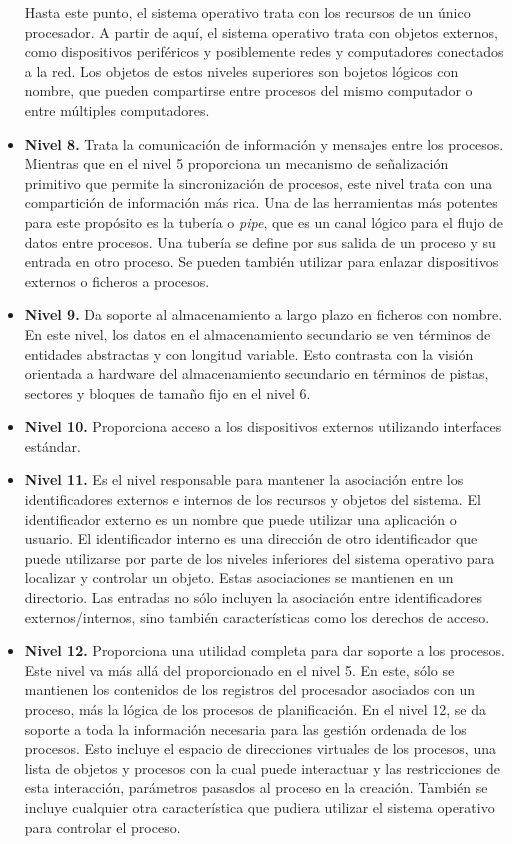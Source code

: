 \documentclass{article}
\begin{document}
\begin{itemize}
				Hasta este punto, el sistema operativo trata con los recursos de un único procesador. A partir de aquí, el sistema operativo trata con objetos externos, como dispositivos periféricos y posiblemente redes y computadores conectados a la red. Los objetos de estos niveles superiores son bojetos lógicos con nombre, que pueden compartirse entre procesos del mismo computador o entre múltiples computadores.
				
				\item \textbf{Nivel 8.} Trata la comunicación de información y mensajes entre los procesos. Mientras que en el nivel 5 proporciona un mecanismo de señalización primitivo que permite la sincronización de procesos, este nivel trata con una compartición de información más rica. Una de las herramientas más potentes para este propósito es la tubería o \textit{pipe}, que es un canal lógico para el flujo de datos entre procesos. Una tubería se define por sus salida de un proceso y su entrada en otro proceso. Se pueden también utilizar para enlazar dispositivos externos o ficheros a procesos. 
				\item \textbf{Nivel 9.} Da soporte al almacenamiento a largo plazo en ficheros con nombre. En este nivel, los datos en el almacenamiento secundario se ven términos de entidades abstractas y con longitud variable. Esto contrasta con la visión orientada a hardware del almacenamiento secundario en términos de pistas, sectores y bloques de tamaño fijo en el nivel 6.
				\item \textbf{Nivel 10.} Proporciona acceso a los dispositivos externos utilizando interfaces estándar.
				\item \textbf{Nivel 11.} Es el nivel responsable para mantener la asociación entre los identificadores externos e internos de los recursos y objetos del sistema. El identificador externo es un nombre que puede utilizar una aplicación o usuario. El identificador interno es una dirección de otro identificador que puede utilizarse por parte de los niveles inferiores del sistema operativo para localizar y controlar un objeto. Estas asociaciones se mantienen en un directorio. Las entradas no sólo incluyen la asociación entre identificadores externos/internos, sino también características como los derechos de acceso.
				
				\item \textbf{Nivel 12.} Proporciona una utilidad completa para dar soporte a los procesos. Este nivel va más allá del proporcionado en el nivel 5. En este, sólo se mantienen los contenidos de los registros del procesador asociados con un proceso, más la lógica de los procesos de planificación. En el nivel 12, se da soporte a toda la información necesaria para las gestión ordenada de los procesos. Esto incluye el espacio de direcciones virtuales de los procesos, una lista de objetos y procesos con la cual puede interactuar y las restricciones de esta interacción, parámetros pasasdos al proceso en la creación. También se incluye cualquier otra característica que pudiera utilizar el sistema operativo para controlar el proceso.	
				

\end{itemize}
\end{document}
